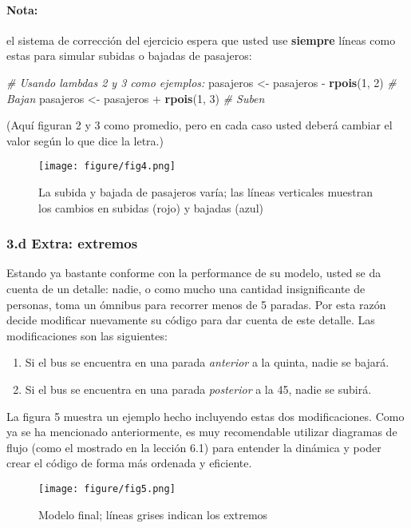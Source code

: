 \documentclass[]{article}
\makeatletter
\newenvironment{Shaded}{}{}
\newcommand{\KeywordTok}[1]{\textcolor[rgb]{0.00,0.44,0.13}{\textbf{{#1}}}}
\newcommand{\DecValTok}[1]{\textcolor[rgb]{0.25,0.63,0.44}{{#1}}}
\newcommand{\CommentTok}[1]{\textcolor[rgb]{0.38,0.63,0.69}{\textit{{#1}}}}
\newcommand{\NormalTok}[1]{{#1}}
\def\maxwidth{\ifdim\Gin@nat@width>\linewidth\linewidth
\else\Gin@nat@width\fi}
\let\Oldincludegraphics\includegraphics
\renewcommand{\includegraphics}[1]{\Oldincludegraphics[width=\maxwidth]{#1}}
\makeatother
\begin{document}
\paragraph{Nota:}

el sistema de corrección del ejercicio espera que usted use
\textbf{siempre} líneas como estas para simular subidas o bajadas de
pasajeros:

\begin{Shaded}
\begin{Highlighting}[]
\CommentTok{# Usando lambdas 2 y 3 como ejemplos:}
\NormalTok{pasajeros <- pasajeros - }\KeywordTok{rpois}\NormalTok{(}\DecValTok{1}\NormalTok{, }\DecValTok{2}\NormalTok{)  }\CommentTok{# Bajan}
\NormalTok{pasajeros <- pasajeros + }\KeywordTok{rpois}\NormalTok{(}\DecValTok{1}\NormalTok{, }\DecValTok{3}\NormalTok{)  }\CommentTok{# Suben}
\end{Highlighting}
\end{Shaded}
(Aquí figuran 2 y 3 como promedio, pero en cada caso usted deberá
cambiar el valor según lo que dice la letra.)

\begin{figure}[htbp]
\centering
\texttt{[image: figure/fig4.png]}
\caption{La subida y bajada de pasajeros varía; las líneas verticales
muestran los cambios en subidas (rojo) y bajadas (azul)}
\end{figure}

\subsubsection{3.d Extra: extremos}

Estando ya bastante conforme con la performance de su modelo, usted se
da cuenta de un detalle: nadie, o como mucho una cantidad insignificante
de personas, toma un ómnibus para recorrer menos de 5 paradas. Por esta
razón decide modificar nuevamente su código para dar cuenta de este
detalle. Las modificaciones son las siguientes:

\begin{enumerate}[1.]
\item
  Si el bus se encuentra en una parada \emph{anterior} a la quinta,
  nadie se bajará.
\item
  Si el bus se encuentra en una parada \emph{posterior} a la 45, nadie
  se subirá.
\end{enumerate}
La figura 5 muestra un ejemplo hecho incluyendo estas dos
modificaciones. Como ya se ha mencionado anteriormente, es muy
recomendable utilizar diagramas de flujo (como el mostrado en la lección
6.1) para entender la dinámica y poder crear el código de forma más
ordenada y eficiente.

\begin{figure}[htbp]
\centering
\texttt{[image: figure/fig5.png]}
\caption{Modelo final; líneas grises indican los extremos}
\end{figure}
\end{document}
